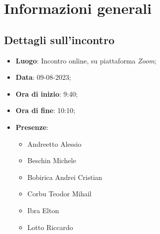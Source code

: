 \section{Informazioni generali}

\subsection{Dettagli sull'incontro}
\begin{itemize}
\item \textbf{Luogo}: Incontro online, su piattaforma \textit{Zoom\glo};
\item \textbf{Data}: 09-08-2023;
\item \textbf{Ora di inizio}: 9:40;
\item \textbf{Ora di fine}: 10:10;
\item \textbf{Presenze}: 
\begin{itemize}
	\item Andreetto Alessio
    \item Beschin Michele
    \item Bobirica Andrei Cristian
    \item Corbu Teodor Mihail
    \item Ibra Elton
    \item Lotto Riccardo 
\end{itemize}
\end{itemize}


